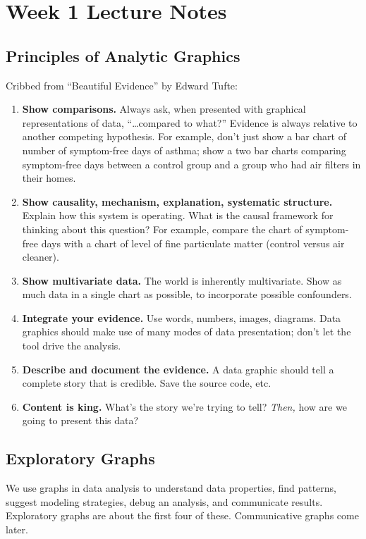 \chapter*{Week 1 Lecture Notes}

\section{Principles of Analytic Graphics}
Cribbed from ``Beautiful Evidence'' by Edward Tufte:

\begin{enumerate}
  \item {\bf Show comparisons.} Always ask, when presented with graphical representations of data, ``\ldots compared to what?'' Evidence is always relative to another competing hypothesis. For example, don't just show a bar chart of number of symptom-free days of asthma; show a two bar charts comparing symptom-free days between a control group and a group who had air filters in their homes.
  \item {\bf Show causality, mechanism, explanation, systematic structure.} Explain how this system is operating. What is the causal framework for thinking about this question? For example, compare the chart of symptom-free days with a chart of level of fine particulate matter (control versus air cleaner).
  \item {\bf Show multivariate data.} The world is inherently multivariate. Show as much data in a single chart as possible, to incorporate possible confounders.
  \item {\bf Integrate your evidence.} Use words, numbers, images, diagrams. Data graphics should make use of many modes of data presentation; don't let the tool drive the analysis.
  \item {\bf Describe and document the evidence.} A data graphic should tell a complete story that is credible. Save the source code, etc.
  \item {\bf Content is king.} What's the story we're trying to tell? \emph{Then,} how are we going to present this data?
\end{enumerate}

\section{Exploratory Graphs}

We use graphs in data analysis to understand data properties, find patterns, suggest modeling strategies, debug an analysis, and communicate results. Exploratory graphs are about the first four of these. Communicative graphs come later.


